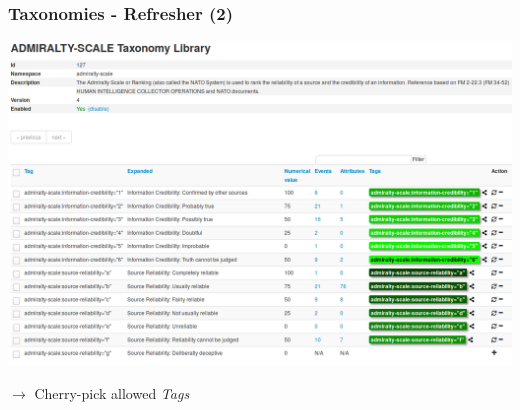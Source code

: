 \begin{frame}
    \frametitle{Taxonomies - Refresher (2)}
    \includegraphics[width=1.00\linewidth]{pics/taxonomy-admiralty-scale.png}
    \begin{center}
        $\rightarrow$ Cherry-pick allowed \textit{Tags}
    \end{center}
\end{frame}

